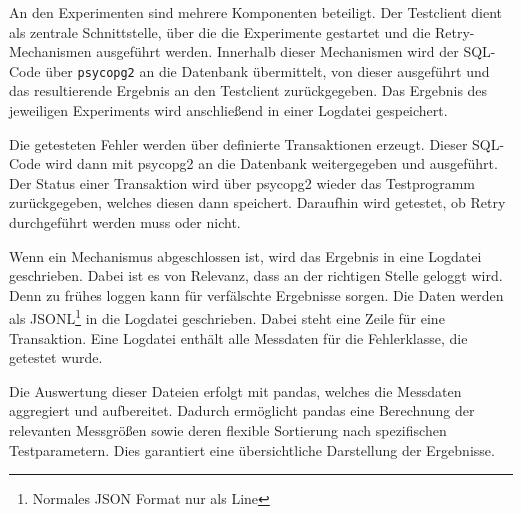 
An den Experimenten sind mehrere Komponenten beteiligt.
Der Testclient dient als zentrale Schnittstelle, über die die Experimente gestartet und die Retry-Mechanismen
ausgeführt werden.
Innerhalb dieser Mechanismen wird der SQL-Code über \texttt{psycopg2} an die Datenbank übermittelt, von dieser
ausgeführt und das resultierende Ergebnis an den Testclient zurückgegeben.
Das Ergebnis des jeweiligen Experiments wird anschließend in einer Logdatei gespeichert.

Die getesteten Fehler werden über definierte Transaktionen erzeugt.
Dieser SQL-Code wird dann mit psycopg2 an die Datenbank weitergegeben und ausgeführt.
Der Status einer Transaktion wird über psycopg2 wieder das Testprogramm zurückgegeben, welches diesen dann speichert.
Daraufhin wird getestet, ob Retry durchgeführt werden muss oder nicht.

Wenn ein Mechanismus abgeschlossen ist, wird das Ergebnis in eine Logdatei geschrieben.
Dabei ist es von Relevanz, dass an der richtigen Stelle geloggt wird.
Denn zu frühes loggen kann für verfälschte Ergebnisse sorgen.
Die Daten werden als JSONL\footnote{Normales JSON Format nur als Line} in die Logdatei geschrieben.
Dabei steht eine Zeile für eine Transaktion.
Eine Logdatei enthält alle Messdaten für die Fehlerklasse, die getestet wurde.

Die Auswertung dieser Dateien erfolgt mit pandas, welches die Messdaten aggregiert und aufbereitet.
Dadurch ermöglicht pandas eine Berechnung der relevanten Messgrößen sowie deren flexible Sortierung nach
spezifischen Testparametern.
Dies garantiert eine übersichtliche Darstellung der Ergebnisse.
